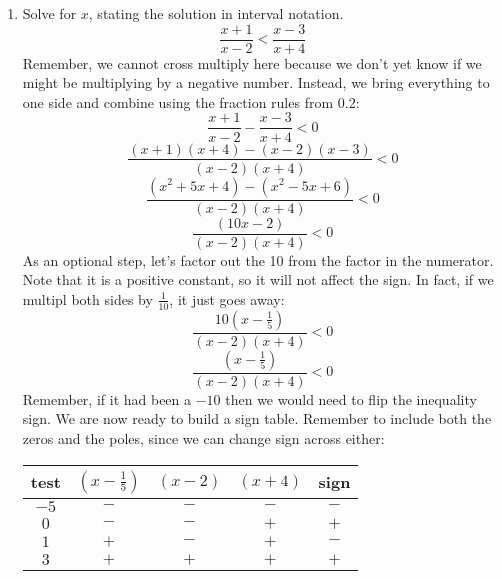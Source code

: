 \documentclass[letterpaper,12pt,fleqn]{article}
\begin{document}
\begin{enumerate}
\begin{enumerate}
    \bigskip

    
    \bigskip

    And the resulting interval notation is:
    $\left(-\infty,-\frac{2}{3}\right]\cup\left[4,\infty\right)$

    \bigskip
  \end{enumerate}

\item Solve for $x$, stating the solution in interval notation.
  \[\frac{x+1}{x-2}<\frac{x-3}{x+4}\]
  Remember, we cannot cross multiply here because we don't yet know if we might
  be multiplying by a negative number. Instead, we bring everything to one
  side and combine using the fraction rules from 0.2:
  \[\frac{x+1}{x-2}-\frac{x-3}{x+4}<0\]
  \[\frac{(x+1)(x+4)-(x-2)(x-3)}{(x-2)(x+4)}<0\]
  \[\frac{(x^2+5x+4)-(x^2-5x+6)}{(x-2)(x+4)}<0\]
  \[\frac{(10x-2)}{(x-2)(x+4)}<0\]
  As an optional step, let's factor out the 10 from the factor in the
  numerator. Note that it is a positive constant, so it will not affect the
  sign. In fact, if we multipl both sides by $\frac{1}{10}$, it just goes
  away:
  \[\frac{10(x-\frac{1}{5})}{(x-2)(x+4)}<0\]
  \[\frac{(x-\frac{1}{5})}{(x-2)(x+4)}<0\]
  Remember, if it had been a $-10$ then we would need to flip the inequality
  sign. We are now ready to build a sign table. Remember to include both the
  zeros and the poles, since we can change sign across either:

  \begin{tabular}{c|ccc|c}
    test & $(x-\frac{1}{5})$ & $(x-2)$ & $(x+4)$ & sign \\
    \hline
    $-5$ & $-$ & $-$ & $-$ & $-$ \\
    $0$ & $-$ & $-$ & $+$ & $+$ \\
    $1$ & $+$ & $-$ & $+$ & $-$ \\
    $3$ & $+$ & $+$ & $+$ & $+$ \\
  \end{tabular}

  \bigskip


\end{enumerate}
\end{document}
